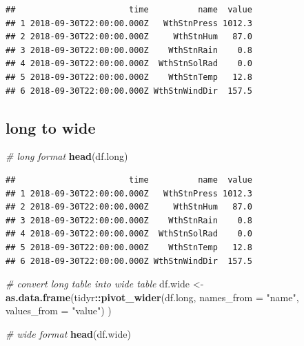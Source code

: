 \documentclass[
]{book}
\newenvironment{Shaded}{\begin{snugshade}}{\end{snugshade}}
\newcommand{\CommentTok}[1]{\textcolor[rgb]{0.56,0.35,0.01}{\textit{#1}}}
\newcommand{\DataTypeTok}[1]{\textcolor[rgb]{0.13,0.29,0.53}{#1}}
\newcommand{\KeywordTok}[1]{\textcolor[rgb]{0.13,0.29,0.53}{\textbf{#1}}}
\newcommand{\NormalTok}[1]{#1}
\newcommand{\OperatorTok}[1]{\textcolor[rgb]{0.81,0.36,0.00}{\textbf{#1}}}
\newcommand{\StringTok}[1]{\textcolor[rgb]{0.31,0.60,0.02}{#1}}
\begin{document}
\begin{verbatim}
##                       time          name  value
## 1 2018-09-30T22:00:00.000Z   WthStnPress 1012.3
## 2 2018-09-30T22:00:00.000Z     WthStnHum   87.0
## 3 2018-09-30T22:00:00.000Z    WthStnRain    0.8
## 4 2018-09-30T22:00:00.000Z  WthStnSolRad    0.0
## 5 2018-09-30T22:00:00.000Z    WthStnTemp   12.8
## 6 2018-09-30T22:00:00.000Z WthStnWindDir  157.5
\end{verbatim}

\hypertarget{long-to-wide}{%
\subsection{long to wide}\label{long-to-wide}}

\begin{Shaded}
\begin{Highlighting}[]
\CommentTok{# long format}
\KeywordTok{head}\NormalTok{(df.long)}
\end{Highlighting}
\end{Shaded}

\begin{verbatim}
##                       time          name  value
## 1 2018-09-30T22:00:00.000Z   WthStnPress 1012.3
## 2 2018-09-30T22:00:00.000Z     WthStnHum   87.0
## 3 2018-09-30T22:00:00.000Z    WthStnRain    0.8
## 4 2018-09-30T22:00:00.000Z  WthStnSolRad    0.0
## 5 2018-09-30T22:00:00.000Z    WthStnTemp   12.8
## 6 2018-09-30T22:00:00.000Z WthStnWindDir  157.5
\end{verbatim}

\begin{Shaded}
\begin{Highlighting}[]
\CommentTok{# convert long table into wide table}
\NormalTok{df.wide <-}\StringTok{ }\KeywordTok{as.data.frame}\NormalTok{(tidyr}\OperatorTok{::}\KeywordTok{pivot_wider}\NormalTok{(df.long,}
                                     \DataTypeTok{names_from =} \StringTok{"name"}\NormalTok{,}
                                     \DataTypeTok{values_from =} \StringTok{"value"}\NormalTok{)}
\NormalTok{                         )}

\CommentTok{# wide format}
\KeywordTok{head}\NormalTok{(df.wide)}
\end{Highlighting}
\end{Shaded}
\end{document}
